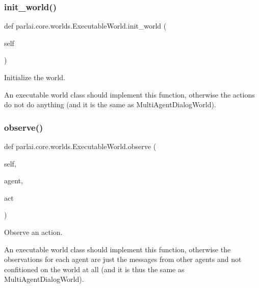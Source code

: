 \subsubsection{\texorpdfstring{init\+\_\+world()}{init\_world()}}
{\footnotesize\ttfamily def parlai.\+core.\+worlds.\+Executable\+World.\+init\+\_\+world (\begin{DoxyParamCaption}\item[{}]{self }\end{DoxyParamCaption})}

\begin{DoxyVerb}Initialize the world.

An executable world class should implement this function, otherwise the actions
do not do anything (and it is the same as MultiAgentDialogWorld).
\end{DoxyVerb}
 \mbox{\label{classparlai_1_1core_1_1worlds_1_1ExecutableWorld_a69934ec2181a8b22269e02ab8b3bb1f2}} 
\subsubsection{\texorpdfstring{observe()}{observe()}}
{\footnotesize\ttfamily def parlai.\+core.\+worlds.\+Executable\+World.\+observe (\begin{DoxyParamCaption}\item[{}]{self,  }\item[{}]{agent,  }\item[{}]{act }\end{DoxyParamCaption})}

\begin{DoxyVerb}Observe an action.

An executable world class should implement this function, otherwise the
observations for each agent are just the messages from other agents and not
confitioned on the world at all (and it is thus the same as
MultiAgentDialogWorld).
\end{DoxyVerb}
 \mbox{\label{classparlai_1_1core_1_1worlds_1_1ExecutableWorld_a6555592d2b7c316e72febc1fccf43bdb}} 
